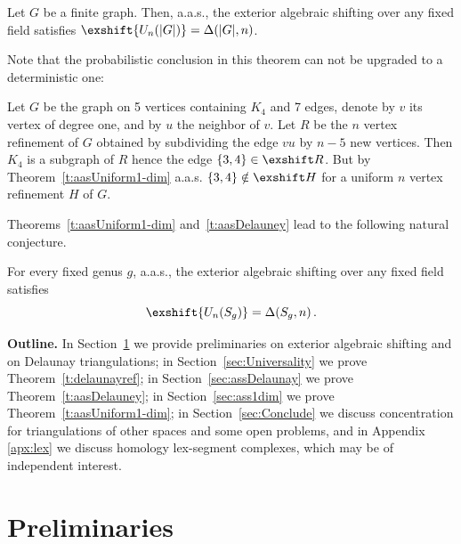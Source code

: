 \begin{theorem}\label{t:aasUniform1-dim}
   Let $G$ be a finite graph. Then, a.a.s., the exterior algebraic shifting over any fixed field satisfies $\exshift {U_n(|G|)}
   = \Delta(|G|,n)$.
\end{theorem}
Note that the probabilistic conclusion in this theorem can not be upgraded to a deterministic one:
\begin{example}\label{ex:graph}
Let $G$ be the graph on 5 vertices containing $K_4$ and 7 edges, denote by $v$ its vertex of degree one, and by $u$ the neighbor of $v$. Let $R$ be the $n$ vertex refinement of $G$ obtained by subdividing the edge $vu$ by $n-5$ new vertices. Then $K_4$ is a subgraph of $R$ hence the edge $\{3,4\}\in \exshift R$. But by Theorem~\ref{t:aasUniform1-dim}  a.a.s. $\{3,4\}\notin \exshift H$ for a uniform $n$ vertex refinement $H$ of $G$.
\end{example}
%
%
Theorems~\ref{t:aasUniform1-dim} and~\ref{t:aasDelauney} lead to the following natural conjecture.
\begin{conjecture}\label{conj:uniform_surface}
For every fixed genus $g$, a.a.s., the exterior algebraic shifting over any fixed field satisfies
     $$\exshift {U_n(S_g)}
     =\Delta(S_g,n)\,.$$
\end{conjecture}
%
%
%
{\bf Outline.} 
In Section~\ref{sec:Prelim} we provide preliminaries on exterior algebraic shifting and on Delaunay triangulations; 
in Section~\ref{sec:Universality} we prove Theorem~\ref{t:delaunayref};  in Section~\ref{sec:assDelaunay} we prove Theorem~\ref{t:aasDelauney}; in Section~\ref{sec:ass1dim} we prove Theorem~\ref{t:aasUniform1-dim}; in Section~\ref{sec:Conclude} we discuss concentration for triangulations of other spaces and some open problems, and in Appendix \ref{apx:lex} we discuss homology lex-segment complexes, which may be of independent interest.
%
\section{Preliminaries}\label{sec:Prelim} 
%
